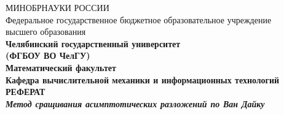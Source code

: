 \documentclass[12pt,a4paper,titlepage]{article}
\theoremstyle{definition}
\theoremstyle{remark}
\begin{document}
\begin{titlepage}
\begin{center}
  МИНОБРНАУКИ РОССИИ\\
  Федеральное государственное бюджетное образовательное учреждение\\ высшего образования\\

\bfseries \flqq Челябинский государственный университет\frqq \\
\bfseries (ФГБОУ ВО \flqq ЧелГУ\frqq) \\[0.7cm]

Математический факультет\\
Кафедра вычислительной механики и информационных технологий\\[3.4cm]
\large\bfseries РЕФЕРАТ\\[1cm]
\textit{\large\bfseries{Метод сращивания асимптотических разложений по Ван Дайку\\[2cm]}}


\end{center}
\end{titlepage}
\end{document}
